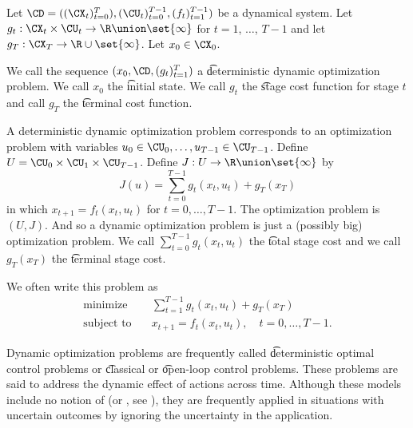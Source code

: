 


Let $\CD = ((\CX_t)_{t = 0}^{T}), (\CU_t)_{t=0}^{T-1}, (f_t)_{t=1}^{T-1})$ be a dynamical system.
Let $g_t: \CX_t \times \CU_t \to \R \union \set{\infty}$ for $t = 1$, $\dots$, $T-1$ and let $g_{T}: \CX_T \to \R \cup \set{\infty}$.
Let $x_0 \in \CX_0$.

We call the sequence $(x_0, \CD, (g_t)_{t = 1}^{T})$ a \t{deterministic dynamic optimization problem}.
We call $x_0$ the \t{initial state}.
We call $g_t$ the \t{stage cost function} for stage $t$ and call $g_T$ the \t{terminal cost function}.

A deterministic dynamic optimization problem corresponds to an optimization problem with variables $u_0 \in \CU_0, \dots, u_{T-1} \in \CU_{T-1}$.
Define $U = \CU_0 \times \CU_1 \times \CU_{T-1}$.
Define $J: U \to \R \union \set{\infty}$ by
\[
    J(u) = \sum_{t = 0}^{T-1} g_t(x_t, u_t) + g_T(x_T)
\]
in which $x_{t+1} = f_t(x_t, u_t)$ for $t = 0, \dots, T-1$.
The optimization problem is $(U, J)$.
And so a dynamic optimization problem is just a (possibly big) optimization problem.
We call $\sum_{t = 0}^{T-1} g_t(x_t, u_t)$ the \t{total stage cost} and we call $g_T(x_T)$ the \t{terminal stage cost}.


We often write this problem as
\[
  \begin{aligned}
  \text{minimize}\quad & \sum_{t = 1}^{T-1} g_t(x_t, u_t) + g_T(x_T) \\
  \text{subject to}\quad & x_{t+1} = f_t(x_t, u_t), \quad t = 0, \dots, T-1.
  \end{aligned}
\]


Dynamic optimization problems are frequently called \t{deterministic optimal control} problems or \t{classical} or \t{open-loop control} problems.
These problems are said to address the dynamic effect of actions across time.
Although these models include no notion of  (or , see ), they are frequently applied in situations with uncertain outcomes by ignoring the uncertainty in the application.

\blankpage
